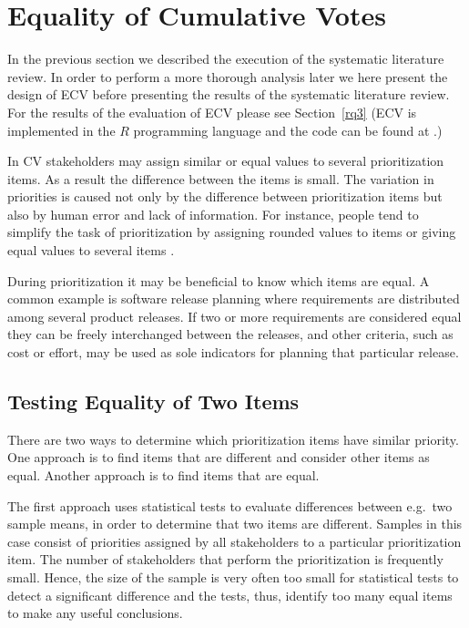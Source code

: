 \section{Equality of Cumulative Votes \label{ecv}}
In the previous section we described the execution of the systematic literature review. In order to perform a more thorough analysis later we here present the design of ECV before presenting the results of the systematic literature review. For the results of the evaluation of ECV please see Section~\ref{rq3} (ECV is implemented in the $R$ programming language \cite{Ihaka1996} and the code can be found at \cite{Rinkevics2011}.)

In CV stakeholders may assign similar or equal values to several prioritization items. As a result the difference between the items is small. The variation in priorities is caused not only by the difference between prioritization items but also by human error and lack of information. For instance, people tend to simplify the task of prioritization by assigning rounded values to items or giving equal values to several items \cite{Groves2009}.

During prioritization it may be beneficial to know which items are equal. A common example is software release planning where requirements are distributed among several product releases. If two or more requirements are considered equal they can be freely interchanged between the releases, and other criteria, such as cost or effort, may be used as sole indicators for planning that particular release.

\subsection{\label{Testing-Equality-of}Testing Equality of Two Items}
There are two ways to determine which prioritization items have similar priority.
One approach is to find items that are different and consider other items as equal.
Another approach is to find items that are equal.

The first approach uses statistical tests to evaluate differences between e.g.\ two sample means, in order to determine that two items are different.
Samples in this case consist of priorities assigned by all stakeholders to a particular prioritization item.
The number of stakeholders that perform the prioritization is frequently small.
Hence, the size of the sample is very often too small for statistical tests to detect a significant difference and the tests, thus, identify too many equal items to make any useful conclusions.

